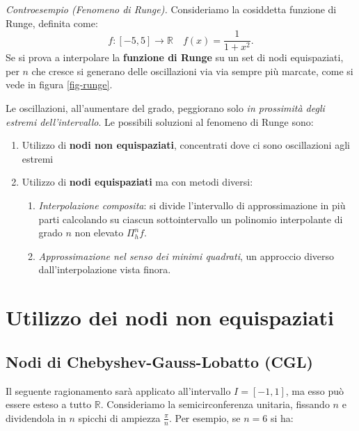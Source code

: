 \textit{Controesempio (Fenomeno di Runge).}
Consideriamo la cosiddetta funzione di Runge, definita come:
\begin{equation*}
f:[ -5,5]\rightarrow \mathbb{R} \quad f(x) =\frac{1}{1+x^{2}}.
\end{equation*}
Se si prova a interpolare la \textbf{funzione di Runge} su un set di nodi equispaziati, per $n$ che cresce si generano delle oscillazioni via via sempre più marcate, come si vede in figura \ref{fig-runge}.


Le oscillazioni, all'aumentare del grado, peggiorano solo \textit{in prossimità degli estremi dell'intervallo}. Le possibili soluzioni al fenomeno di Runge sono:
\begin{enumerate}
\item Utilizzo di \textbf{nodi non equispaziati}, concentrati dove ci sono oscillazioni agli estremi
\item Utilizzo di \textbf{nodi equispaziati} ma con metodi diversi:
\begin{enumerate}
\item \textit{Interpolazione composita}: si divide l'intervallo di approssimazione in più parti calcolando su ciascun sottointervallo un polinomio interpolante di grado $n$ non elevato $\Pi ^{n}_{h} f$.
\item \textit{Approssimazione nel senso dei minimi quadrati}, un approccio diverso dall'interpolazione vista finora.
\end{enumerate}
\end{enumerate}
\section{Utilizzo dei nodi non equispaziati}
\subsection{Nodi di Chebyshev-Gauss-Lobatto (CGL)}
Il seguente ragionamento sarà applicato all'intervallo $I=[ -1,1]$, ma esso può essere esteso a tutto $\mathbb{R}$. Consideriamo la semicirconferenza unitaria, fissando $n$ e dividendola in $n$ spicchi di ampiezza $\frac{\pi }{n}$.
Per esempio, se $n=6$ si ha:

